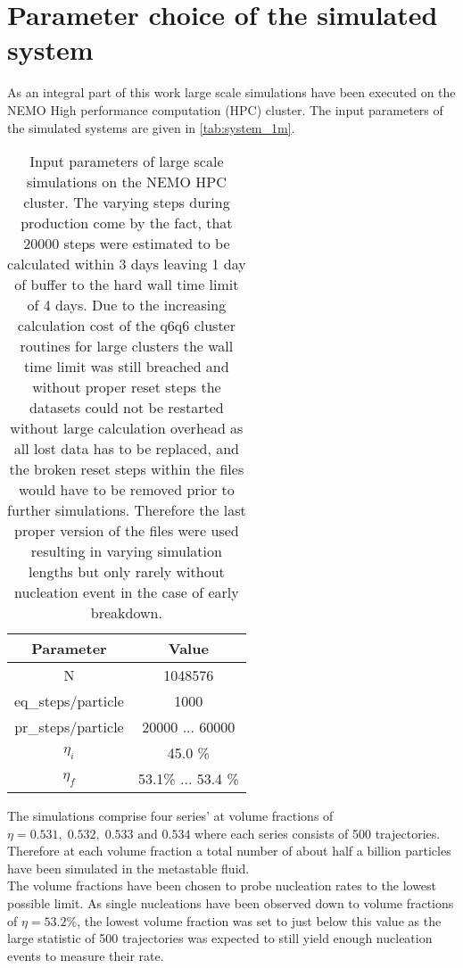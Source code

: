 
\label{chp:data_analysis}
\section{Parameter choice of the simulated system}
\label{sec:system_choice}
As an integral part of this work large scale simulations have been executed on the NEMO High performance computation (HPC) cluster. The input parameters of the simulated systems are given in \autoref{tab:system_1m}.

\begin{table}[h]
\centering
\begin{tabular}{c|c}
Parameter & Value \\ \hline
N & 1048576 \\
eq\_steps/particle & 1000 \\
pr\_steps/particle & 20000  ... 60000 \\
$\eta_i$ & 45.0 \% \\
$\eta_f$ & 53.1\% ... 53.4 \% \\
\end{tabular}
\caption[Simulation parameters of data production systems]{Input parameters of large scale simulations on the NEMO HPC cluster. The varying steps during production come by the fact, that 20000 steps were estimated to be calculated within 3 days leaving 1 day of buffer to the hard wall time limit of 4 days. Due to the increasing calculation cost of the q6q6 cluster routines for large clusters the wall time limit was still breached and without proper reset steps the datasets could not be restarted without large calculation overhead as all lost data has to be replaced, and the broken reset steps within the files would have to be removed prior to further simulations. Therefore the last proper version of the files were used resulting in varying simulation lengths but only rarely without nucleation event in the case of early breakdown.}
\label{tab:system_1m}
\end{table}

The simulations comprise four series' at volume fractions of $\eta = 0.531,\;0.532,\;0.533 \text{ and }0.534$ where each series consists of 500 trajectories. Therefore at each volume fraction a total number of about half a billion particles have been simulated in the metastable fluid.\\

The volume fractions have been chosen to probe nucleation rates to the lowest possible limit. As single nucleations have been observed down to volume fractions of $\eta=53.2\%$, the lowest volume fraction was set to just below this value as the large statistic of 500 trajectories was expected to still yield enough nucleation events to measure their rate.\\

